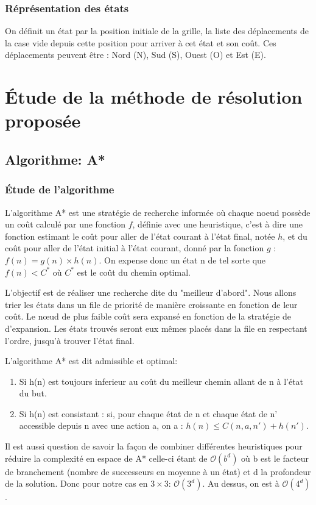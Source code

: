 \documentclass[a4paper, 12pt]{article}
\begin{document}
    \subsubsection{Réprésentation des états}
    On définit un état par la position initiale de la grille, la liste des déplacements de la case vide depuis cette position pour arriver à cet état et son coût. Ces déplacements peuvent être : Nord (N), Sud (S), Ouest (O) et Est (E).
    
    \section{Étude de la méthode de résolution proposée}
    
    \subsection{Algorithme: A*}

    \subsubsection{Étude de l'algorithme}

    L'algorithme A* est une stratégie de recherche informée où chaque noeud possède un coût calculé par une fonction $f$, définie avec une heuristique, c'est à dire une fonction estimant le coût pour aller de l'état courant à l'état final, notée $h$, et du coût pour aller de l'état initial à l'état courant, donné par la fonction $g$ : $ f(n) = g(n) \times h(n)$. On expense donc un état n de tel sorte que $f(n)<C^*$  où $C^*$ est le coût du chemin optimal. 
    
    L'objectif est de réaliser une recherche dite du "meilleur d'abord". Nous allons trier les états dans un file de priorité de manière croissante en fonction de leur coût. Le n\oe ud de plus faible coût sera expansé en fonction de la stratégie de d'expansion. 
    Les états trouvés seront eux mêmes placés dans la file en respectant l'ordre, jusqu'à trouver l'état final. 
    
    L'algorithme A* est dit admissible et optimal:
    \begin{enumerate}
        \item Si h(n) est toujours inferieur au coût du meilleur chemin allant de n à l'état du but.
        \item Si h(n) est consistant : si, pour chaque état de n et chaque état de n' accessible depuis n avec une action a, on a : $h(n) \leq C(n,a,n')+h(n')$.
    \end{enumerate}
    Il est aussi question de savoir la façon de combiner différentes heuristiques pour réduire la complexité en espace de A* celle-ci étant de $\mathcal{O}(b^{d})$ où b est le facteur de branchement (nombre de successeurs en moyenne à un état) et d la profondeur de la solution.
    Donc pour notre cas en $3 \times 3$: $\mathcal{O}(3^{d})$. Au dessus, on est à $\mathcal{O}(4^{d})$.
\end{document}
